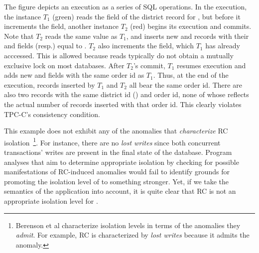 
The figure depicts an execution as a series of SQL operations. In the
execution, the  instance $T_1$ (green) reads the
 field of the district record for , but
before it increments the field, another  instance
$T_2$ (red) begins its execution and commits. Note that $T_2$ reads the
same  value as $T_1$, and inserts new  and
 records with their  and  fields
(resp.) equal to . $T_2$ also increments the
 field, which $T_1$ has already acccessed. This is
allowed because reads typically do not obtain a mutually exclusive
lock on most databases. After $T_2$'s commit, $T_1$ resumes execution
and adds new  and  fields with the same order
id as $T_1$. Thus, at the end of the execution, 
records inserted by $T_1$ and $T_2$ all bear the same order id. There
are also two  records with the same district id ()
and order id, none of whose  reflects the actual number
of  records inserted with that order id.  This clearly
violates TPC-C's consistency condition.

This example does not exhibit any of the anomalies that
\emph{characterize} RC isolation~\cite{berenson}\footnote{Berenson et
al characterize isolation levels in terms of the
anomalies they \emph{admit}. For example, RC is characterized by
\emph{lost writes} because it admits the anomaly.}. For instance,
there are no \emph{lost writes} since both concurrent transactions' writes
are present in the final state of the database.  Program analyses that
aim to determine appropriate isolation by checking for possible
manifestations of RC-induced anomalies would fail to identify grounds
for promoting the isolation level of  to something
stronger.  Yet, if we take the semantics of the application into
account, it is quite clear that RC is not an appropriate isolation
level for .

